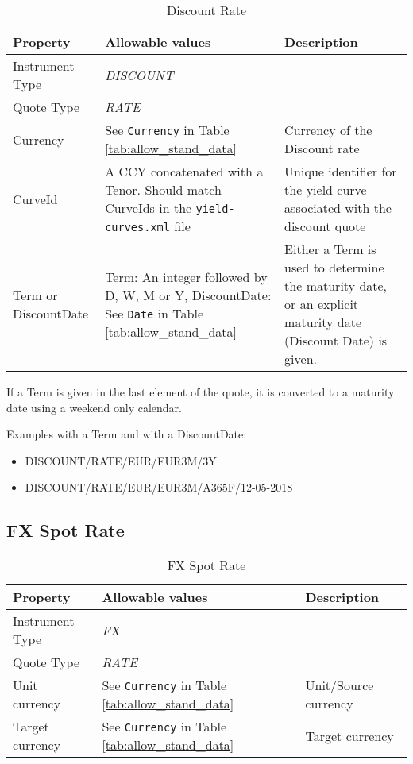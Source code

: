 \begin{table}[H]
\centering
\begin{tabular}{|p{3.3cm}|p{5cm}|p{7cm}|}
  \hline
  {\bf Property} & {\bf Allowable values} & {\bf Description} \\ \hline
  Instrument Type & \emph{DISCOUNT} & \\ \hline
  Quote Type & \emph{RATE} & \\ \hline
  Currency & See \lstinline!Currency! in Table \ref{tab:allow_stand_data} & Currency of the Discount rate\\ \hline
  CurveId& A CCY concatenated with a Tenor. Should match CurveIds in the {\tt yield-curves.xml} file & Unique identifier for the yield curve associated with the discount quote\\ \hline
  Term or DiscountDate & Term: An integer followed by D, W, M or Y, DiscountDate: See \lstinline!Date! in Table \ref{tab:allow_stand_data} & Either a Term is used to determine the maturity date, or an explicit maturity date (Discount Date) is given.\\ \hline
\end{tabular}
  \caption{Discount Rate}
  \label{tab:discount_quote}
\end{table}

If a Term is given in the last element of the quote, it is converted to a maturity date using a weekend only calendar.

\medskip
Examples with a Term and with a DiscountDate:
\begin{itemize}
\item {DISCOUNT/RATE/EUR/EUR3M/3Y}
\item {DISCOUNT/RATE/EUR/EUR3M/A365F/12-05-2018}
\end{itemize}

\subsection{FX Spot Rate}
\label{ss:fx_spot_rate}

\begin{table}[H]
\centering
  \begin{tabular}{|p{3cm}|p{3.5cm}|p{7cm}|}
  \hline
    {\bf Property} & {\bf Allowable values} & {\bf Description}\\ \hline
    Instrument Type & \emph{FX} & \\ \hline
    Quote Type & \emph{RATE} & \\ \hline
    Unit currency & See \lstinline!Currency! in Table \ref{tab:allow_stand_data} & Unit/Source currency\\ \hline
    Target currency & See \lstinline!Currency! in Table \ref{tab:allow_stand_data} & Target currency\\ \hline
  \end{tabular}
  \caption{FX Spot Rate}
  \label{tab:fxspot_quote}
\end{table}

